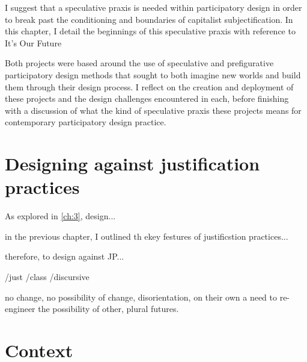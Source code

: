 I suggest that a speculative praxis is needed within participatory design in order to break past the conditioning and boundaries of capitalist subjectification. In this chapter, I detail the beginnings of this speculative praxis with reference to It’s Our Future

Both projects were based around the use of speculative and prefigurative participatory design methods that sought to both imagine new worlds and build them through their design process. I reflect on the creation and deployment of these projects and the design challenges encountered in each, before finishing with a discussion of what the kind of speculative praxis these projects means for contemporary participatory design practice.


\section{Designing against justification practices}
As explored in \ref{ch:3}, design...

in the previous chapter, I outlined th ekey festures of justificstion practices...

therefore, to design against JP...

/just
/class
/discursive

	no change, no possibility of change, disorientation, on their own
	a need to re-engineer the possibility of other, plural futures.


\section{Context}

